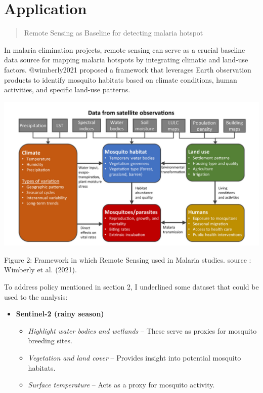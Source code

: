 \documentclass[
  letterpaper,
  DIV=11,
  numbers=noendperiod]{scrreprt}
\begin{document}
\hypertarget{application-2}{%
\section{Application}\label{application-2}}

\begin{quote}
Remote Sensing as Baseline for detecting malaria hotspot
\end{quote}

In malaria elimination projects, remote sensing can serve as a crucial
baseline data source for mapping malaria hotspots by integrating
climatic and land-use factors. @wimberly2021 proposed a framework that
leverages Earth observation products to identify mosquito habitats based
on climate conditions, human activities, and specific land-use patterns.

\includegraphics[width=7in,height=\textheight]{images/clipboard-687725868.png}

Figure 2: Framework in which Remote Sensing used in Malaria studies.
source : Wimberly et al. (2021).

To address policy mentioned in section 2, I underlined some dataset that
could be used to the analysis:

\begin{itemize}
\item
  \textbf{Sentinel-2 (rainy season)}

  \begin{itemize}
  \item
    \emph{Highlight water bodies and wetlands} -- These serve as proxies
    for mosquito breeding sites.
  \item
    \emph{Vegetation and land cover} -- Provides insight into potential
    mosquito habitats.
  \item
    \emph{Surface temperature} -- Acts as a proxy for mosquito activity.
  \end{itemize}
\end{itemize}
\end{document}
